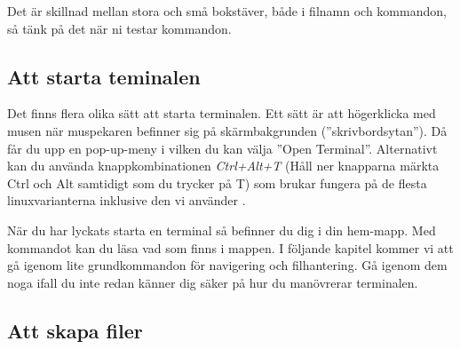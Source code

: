 \documentclass[a4paper,twocolumn]{book}
\begin{document}
Det är skillnad mellan stora och små bokstäver, både i filnamn och kommandon, så
tänk på det när ni testar kommandon.

\subsection{Att starta teminalen}
Det finns flera olika sätt att starta terminalen. Ett sätt är att högerklicka med musen när muspekaren befinner sig på skärmbakgrunden (''skrivbordsytan''). Då får du upp en pop-up-meny i vilken du kan välja ''Open Terminal''.
Alternativt kan du använda knappkombinationen \emph{Ctrl+Alt+T} (Håll ner knapparna märkta Ctrl och Alt samtidigt som du trycker på T) som brukar fungera på de flesta linuxvarianterna inklusive den vi använder .  

När du har lyckats starta en terminal så befinner du dig i din hem-mapp. Med kommandot   kan du läsa vad som finns i mappen. 
I följande kapitel kommer vi att gå igenom lite grundkommandon för navigering och filhantering. Gå igenom dem noga ifall du inte redan 
känner dig säker på hur du manövrerar terminalen.

\subsection{Att skapa filer}
\end{document}
